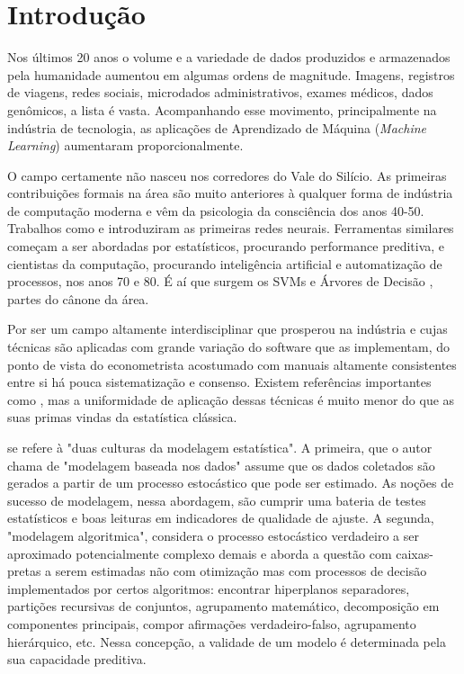 

\chapter{Introdução}
\label{cap:intro} %



Nos últimos 20 anos o volume e a variedade de dados produzidos e armazenados pela humanidade aumentou em algumas ordens de magnitude.  Imagens, registros de viagens, redes sociais, microdados administrativos, exames médicos, dados genômicos, a lista é vasta. Acompanhando esse movimento, principalmente na indústria de tecnologia, as aplicações de Aprendizado de Máquina (\textit{Machine Learning}) aumentaram proporcionalmente.

O campo certamente não nasceu nos corredores do Vale do Silício. As primeiras contribuições formais na área são muito anteriores à qualquer forma de indústria de computação moderna e vêm da psicologia da consciência dos anos 40-50. Trabalhos como  e  introduziram as primeiras redes neurais. Ferramentas similares começam a ser abordadas por estatísticos, procurando performance preditiva, e cientistas da computação, procurando inteligência artificial e automatização de processos, nos anos 70 e 80. É aí que surgem os SVMs \cite{vapnik1974theory} e Árvores de Decisão \cite{breiman1984classification}, partes do cânone da área.

Por ser um campo altamente interdisciplinar que prosperou na indústria e cujas técnicas são aplicadas com grande variação do software que as implementam, do ponto de vista do econometrista acostumado com manuais altamente consistentes entre si há pouca sistematização e consenso. Existem referências importantes como , mas a uniformidade de aplicação dessas técnicas é muito menor do que as suas primas vindas da estatística clássica. 

 se refere à "duas culturas da modelagem estatística". A primeira, que o autor chama de "modelagem baseada nos dados" assume que os dados coletados são gerados a partir de um processo estocástico que pode ser estimado. As noções de sucesso de modelagem, nessa abordagem, são cumprir uma bateria de testes estatísticos e boas leituras em indicadores de qualidade de ajuste. A segunda, "modelagem algoritmica", considera o processo estocástico verdadeiro a ser aproximado potencialmente complexo demais e aborda a questão com caixas-pretas a serem estimadas não com otimização mas com processos de decisão implementados por certos algoritmos: encontrar hiperplanos separadores, partições recursivas de conjuntos, agrupamento matemático, decomposição em componentes principais, compor afirmações verdadeiro-falso, agrupamento hierárquico, etc. Nessa concepção, a validade de um modelo é determinada pela sua capacidade preditiva. 

